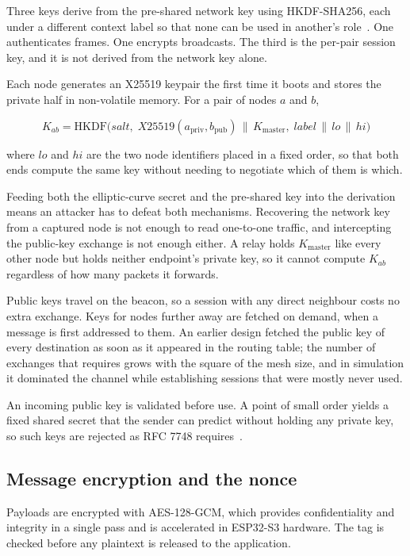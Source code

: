 \documentclass[12pt,a4paper,oneside]{report}
\begin{document}
Three keys derive from the pre-shared network key using HKDF-SHA256, each under a
different context label so that none can be used in another's
role~\cite{rfc5869}. One authenticates frames. One encrypts broadcasts. The third
is the per-pair session key, and it is not derived from the network key alone.

Each node generates an X25519 keypair the first time it boots and stores the
private half in non-volatile memory. For a pair of nodes $a$ and $b$,

\[
K_{ab} = \mathrm{HKDF}\bigl(\mathit{salt},\;
  X25519(a_{\text{priv}}, b_{\text{pub}}) \,\|\, K_{\text{master}},\;
  \mathit{label} \,\|\, \mathit{lo} \,\|\, \mathit{hi}\bigr)
\]

where $\mathit{lo}$ and $\mathit{hi}$ are the two node identifiers placed in a
fixed order, so that both ends compute the same key without needing to negotiate
which of them is which.

Feeding both the elliptic-curve secret and the pre-shared key into the derivation
means an attacker has to defeat both mechanisms. Recovering the network key from
a captured node is not enough to read one-to-one traffic, and intercepting the
public-key exchange is not enough either. A relay holds $K_{\text{master}}$ like
every other node but holds neither endpoint's private key, so it cannot compute
$K_{ab}$ regardless of how many packets it forwards.

Public keys travel on the beacon, so a session with any direct neighbour costs no
extra exchange. Keys for nodes further away are fetched on demand, when a message
is first addressed to them. An earlier design fetched the public key of every
destination as soon as it appeared in the routing table; the number of exchanges
that requires grows with the square of the mesh size, and in simulation it
dominated the channel while establishing sessions that were mostly never used.

An incoming public key is validated before use. A point of small order yields a
fixed shared secret that the sender can predict without holding any private key,
so such keys are rejected as RFC 7748 requires~\cite{rfc7748}.

\subsection{Message encryption and the nonce}

Payloads are encrypted with AES-128-GCM, which provides confidentiality and
integrity in a single pass and is accelerated in ESP32-S3 hardware. The tag is
checked before any plaintext is released to the application.
\end{document}
